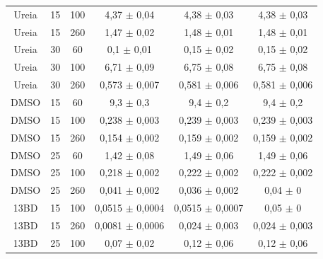 \begin{table}[h]
{\begin{tabular}{c c c | c c c }
			  Ureia   & 15         & 100        & 4,37    \(\pm\) 0,04   & 4,38     \(\pm\) 0,03   & 4,38      \(\pm\) 0,03   \\
			  Ureia   & 15         & 260        & 1,47    \(\pm\) 0,02   & 1,48     \(\pm\) 0,01   & 1,48      \(\pm\) 0,01   \\
			  Ureia   & 30         & 60         & 0,1     \(\pm\) 0,01   & 0,15     \(\pm\) 0,02   & 0,15      \(\pm\) 0,02   \\
			  Ureia   & 30         & 100        & 6,71    \(\pm\) 0,09   & 6,75     \(\pm\) 0,08   & 6,75      \(\pm\) 0,08   \\
			  Ureia   & 30         & 260        & 0,573   \(\pm\) 0,007  & 0,581    \(\pm\) 0,006  & 0,581     \(\pm\) 0,006  \\  \midrule
			  DMSO    & 15         & 60         & 9,3     \(\pm\) 0,3    & 9,4      \(\pm\) 0,2    & 9,4       \(\pm\) 0,2    \\
			  DMSO    & 15         & 100        & 0,238   \(\pm\) 0,003  & 0,239    \(\pm\) 0,003  & 0,239     \(\pm\) 0,003  \\
			  DMSO    & 15         & 260        & 0,154   \(\pm\) 0,002  & 0,159    \(\pm\) 0,002  & 0,159     \(\pm\) 0,002  \\
			  DMSO    & 25         & 60         & 1,42    \(\pm\) 0,08   & 1,49     \(\pm\) 0,06   & 1,49      \(\pm\) 0,06   \\
			  DMSO    & 25         & 100        & 0,218   \(\pm\) 0,002  & 0,222    \(\pm\) 0,002  & 0,222     \(\pm\) 0,002  \\
			  DMSO    & 25         & 260        & 0,041   \(\pm\) 0,002  & 0,036    \(\pm\) 0,002  & 0,04      \(\pm\) 0      \\
			  13BD    & 15         & 100        & 0,0515  \(\pm\) 0,0004 & 0,0515   \(\pm\) 0,0007 & 0,05      \(\pm\) 0      \\
			  13BD    & 15         & 260        & 0,0081  \(\pm\) 0,0006 & 0,024    \(\pm\) 0,003  & 0,024     \(\pm\) 0,003  \\
			  13BD    & 25         & 100        & 0,07    \(\pm\) 0,02   & 0,12     \(\pm\) 0,06   & 0,12      \(\pm\) 0,06		\\ \bottomrule
		\end{tabular}
	}{}
\end{table} 

